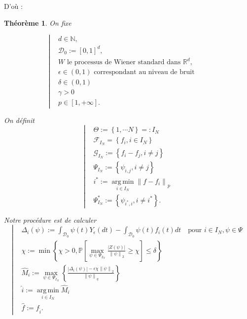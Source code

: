 \documentclass[11pt,letterpaper]{article}
\DeclareMathOperator*{\argmin}{arg\,min}
\newtheorem{theorem}{Théorème}
\begin{document}
\par D'où : 
\begin{theorem}

\par On fixe

\begin{equation}
 	\left|
 	\begin{split}
 	& d \in \mathbb{N} , \\ 
    & \mathcal{D}_0 := \left[0, 1 \right]^{d} , \\
    & W \text{ le processus de Wiener standard dans } \mathbb{R}^d , \\
    & \epsilon \in \left(0, 1 \right) \text{ correspondant au niveau de bruit} \\
	& \delta \in \left( 0, 1 \right) \\
	& \gamma > 0 \\
	& p \in \left[ 1, + \infty \right] . &&
    \end{split}
  \right.
\end{equation}

\par On définit
\begin{equation}
 	\left|
    \begin{split}
    & \Theta := \left\lbrace 1, \cdots N \right\rbrace =: I_N \\
    & \mathcal{F}_{I_N} = \left\lbrace f_i, i \in I_N \right\rbrace \\
    & \mathcal{G}_{I_N} := \left\lbrace f_i - f_j, i \neq j \right\rbrace \\
    & \Psi_{I_N} := \left\lbrace \psi_{i, j}, i \neq j \right\rbrace \\
    & i^{*} := \argmin\limits_{i \in I_N} \left\| f - f_i \right\|_p \\
    & \Psi_{I_N}^{*} := \left\lbrace \psi_{i^{*}, i}, i \neq i^{*} \right\rbrace .
    \end{split}
  \right.
\end{equation}

\par Notre procédure est de calculer 
\begin{equation}
 	\left|
    \begin{split}
    & \Delta_i \left( \psi \right) := \int_{\mathcal{D}_0}^{} \psi \left( t \right) Y_\epsilon \left( dt \right) -  \int_{\mathcal{D}_0}^{} \psi \left( t \right) f_i \left( t \right) dt \quad \text{pour } i \in I_N, \psi \in \Psi \\
    & \chi := \min \left\lbrace \chi > 0, \mathbb{P} \left[ \max\limits_{\psi \in \Psi_{I_N}} \frac{\left| Z \left( \psi \right) \right|}{\left\| \psi \right\|_2} \geq \chi \right] \leq \delta \right\rbrace\\
    & \hat{M}_i := \max\limits_{\psi \in \Psi_{I_N}} \left\lbrace \frac{\left| \Delta_i \left( \psi \right) \right| - \epsilon \chi \left\| \psi \right\|_2}{\left\| \psi \right\|_q} \right\rbrace \\
    & \hat{i} := \argmin\limits_{i \in I_N} \hat{M}_i \\
    & \hat{f} := f_{\hat{i}} .
    \end{split}
  \right.
\end{equation}


\end{theorem}
\end{document}
